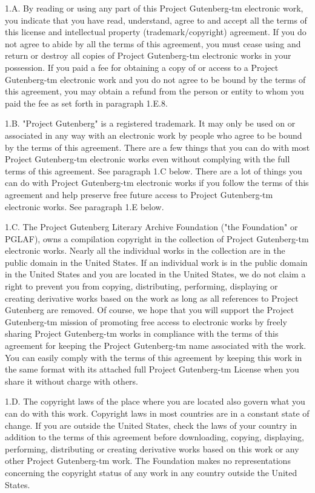 \begin{PGtext}
1.A.  By reading or using any part of this Project Gutenberg-tm
electronic work, you indicate that you have read, understand, agree to
and accept all the terms of this license and intellectual property
(trademark/copyright) agreement.  If you do not agree to abide by all
the terms of this agreement, you must cease using and return or destroy
all copies of Project Gutenberg-tm electronic works in your possession.
If you paid a fee for obtaining a copy of or access to a Project
Gutenberg-tm electronic work and you do not agree to be bound by the
terms of this agreement, you may obtain a refund from the person or
entity to whom you paid the fee as set forth in paragraph 1.E.8.

1.B.  "Project Gutenberg" is a registered trademark.  It may only be
used on or associated in any way with an electronic work by people who
agree to be bound by the terms of this agreement.  There are a few
things that you can do with most Project Gutenberg-tm electronic works
even without complying with the full terms of this agreement.  See
paragraph 1.C below.  There are a lot of things you can do with Project
Gutenberg-tm electronic works if you follow the terms of this agreement
and help preserve free future access to Project Gutenberg-tm electronic
works.  See paragraph 1.E below.

1.C.  The Project Gutenberg Literary Archive Foundation ("the Foundation"
or PGLAF), owns a compilation copyright in the collection of Project
Gutenberg-tm electronic works.  Nearly all the individual works in the
collection are in the public domain in the United States.  If an
individual work is in the public domain in the United States and you are
located in the United States, we do not claim a right to prevent you from
copying, distributing, performing, displaying or creating derivative
works based on the work as long as all references to Project Gutenberg
are removed.  Of course, we hope that you will support the Project
Gutenberg-tm mission of promoting free access to electronic works by
freely sharing Project Gutenberg-tm works in compliance with the terms of
this agreement for keeping the Project Gutenberg-tm name associated with
the work.  You can easily comply with the terms of this agreement by
keeping this work in the same format with its attached full Project
Gutenberg-tm License when you share it without charge with others.

1.D.  The copyright laws of the place where you are located also govern
what you can do with this work.  Copyright laws in most countries are in
a constant state of change.  If you are outside the United States, check
the laws of your country in addition to the terms of this agreement
before downloading, copying, displaying, performing, distributing or
creating derivative works based on this work or any other Project
Gutenberg-tm work.  The Foundation makes no representations concerning
the copyright status of any work in any country outside the United
States.


\end{PGtext}
